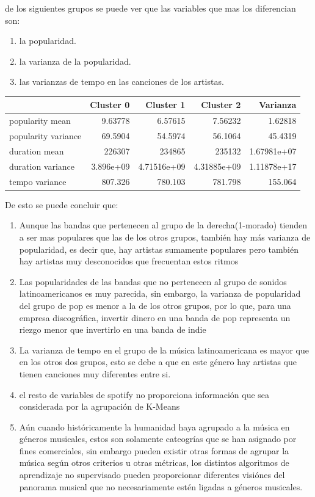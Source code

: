 \documentclass[11pt]{article}
\begin{document}
de los siguientes grupos se puede ver que las variables que mas los diferencian
son:
\begin{enumerate}
\item la popularidad.
\item la varianza de la popularidad.
\item las varianzas de tempo en las canciones de los artistas.
\end{enumerate}

\begin{center}
\begin{tabular}{lrrrr}
 & Cluster 0 & Cluster 1 & Cluster 2 & Varianza\\
\hline
popularity mean & 9.63778 & 6.57615 & 7.56232 & 1.62818\\
popularity variance & 69.5904 & 54.5974 & 56.1064 & 45.4319\\
duration mean & 226307 & 234865 & 235132 & 1.67981e+07\\
duration variance & 3.896e+09 & 4.71516e+09 & 4.31885e+09 & 1.11878e+17\\
tempo variance & 807.326 & 780.103 & 781.798 & 155.064\\
\end{tabular}
\end{center}

De esto se puede concluir que:

\begin{enumerate}
\item Aunque las bandas que pertenecen al grupo de la derecha(1-morado) tienden a ser mas populares que las de los otros grupos, también hay más varianza de popularidad, es decir que, hay artistas sumamente populares pero también hay artistas muy desconocidos que frecuentan estos ritmos
\item Las popularidades de las bandas que no pertenecen al grupo de sonidos latinoamericanos es muy parecida, sin embargo, la varianza de popularidad del grupo de pop es menor a la de los otros grupos, por lo que, para una empresa discográfica, invertir dinero en una banda de pop representa un riezgo menor que invertirlo en una banda de indie
\item La varianza de tempo en el grupo de la música latinoamericana es mayor que en los otros dos grupos, esto se debe a que en este género hay artistas que tienen canciones muy diferentes entre si.
\item el resto de variables de spotify no proporciona información que sea considerada por la agrupación de K-Means
\item Aún cuando históricamente la humanidad haya agrupado a la música en géneros musicales, estos son solamente cateogrías que se han asignado por fines comerciales, sin embargo pueden existir otras formas de agrupar la música según otros criterios u otras métricas, los distintos algoritmos de aprendizaje no supervisado pueden proporcionar diferentes visiónes del panorama musical que no necesariamente estén ligadas a géneros musicales.
\end{enumerate}
\end{document}
